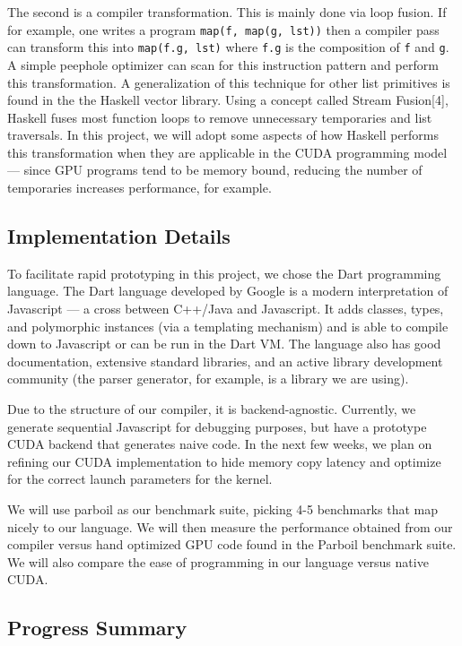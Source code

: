 The second is a compiler transformation. This is mainly done via loop
fusion. If for example, one writes a program
\texttt{map(f, map(g, lst))} then a compiler pass can transform this
into \texttt{map(f.g, lst)} where \texttt{f.g} is the composition of
\texttt{f} and \texttt{g}. A simple peephole optimizer can scan for this
instruction pattern and perform this transformation. A generalization of
this technique for other list primitives is found in the the Haskell
vector library. Using a concept called Stream Fusion{[}4{]}, Haskell
fuses most function loops to remove unnecessary temporaries and list
traversals. In this project, we will adopt some aspects of how Haskell
performs this transformation when they are applicable in the CUDA
programming model --- since GPU programs tend to be memory bound,
reducing the number of temporaries increases performance, for example.

\subsection{Implementation Details}

To facilitate rapid prototyping in this project, we chose the Dart
programming language. The Dart language developed by Google is a modern
interpretation of Javascript --- a cross between C++/Java and
Javascript. It adds classes, types, and polymorphic instances (via a
templating mechanism) and is able to compile down to Javascript or can
be run in the Dart VM. The language also has good documentation,
extensive standard libraries, and an active library development
community (the parser generator, for example, is a library we are
using).

Due to the structure of our compiler, it is backend-agnostic. Currently,
we generate sequential Javascript for debugging purposes, but have a
prototype CUDA backend that generates naive code. In the next few weeks,
we plan on refining our CUDA implementation to hide memory copy latency
and optimize for the correct launch parameters for the kernel.

We will use parboil as our benchmark suite, picking 4-5 benchmarks that
map nicely to our language. We will then measure the performance
obtained from our compiler versus hand optimized GPU code found in the
Parboil benchmark suite. We will also compare the ease of programming in
our language versus native CUDA.

\subsection{Progress Summary}

